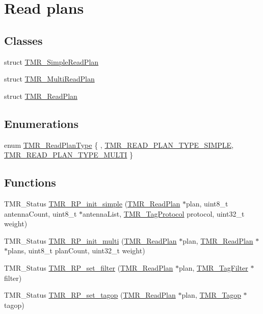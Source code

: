 \hypertarget{group__readplan}{
\section{Read plans}
\label{group__readplan}
}
\subsection*{Classes}
\begin{CompactItemize}
\item 
struct \hyperlink{struct_t_m_r___simple_read_plan}{TMR\_\-SimpleReadPlan}
\item 
struct \hyperlink{struct_t_m_r___multi_read_plan}{TMR\_\-MultiReadPlan}
\item 
struct \hyperlink{struct_t_m_r___read_plan}{TMR\_\-ReadPlan}
\end{CompactItemize}
\subsection*{Enumerations}
\begin{CompactItemize}
\item 
enum \hyperlink{group__readplan_g4646d0bb9359362ac44e57f04f7e429c}{TMR\_\-ReadPlanType} \{ , \hyperlink{group__readplan_gg4646d0bb9359362ac44e57f04f7e429ce19fe5cee99f0bd3a3ae118dced8e426}{TMR\_\-READ\_\-PLAN\_\-TYPE\_\-SIMPLE}, 
\hyperlink{group__readplan_gg4646d0bb9359362ac44e57f04f7e429c886bea5e75d6b2f7d11574666450ab77}{TMR\_\-READ\_\-PLAN\_\-TYPE\_\-MULTI}
 \}
\end{CompactItemize}
\subsection*{Functions}
\begin{CompactItemize}
\item 
TMR\_\-Status \hyperlink{group__readplan_g1af189d2675156c9a068367219fa3d98}{TMR\_\-RP\_\-init\_\-simple} (\hyperlink{struct_t_m_r___read_plan}{TMR\_\-ReadPlan} $\ast$plan, uint8\_\-t antennaCount, uint8\_\-t $\ast$antennaList, \hyperlink{tmr__tag__protocol_8h_1e727f69e94ccc81da4d3b9440aba934}{TMR\_\-TagProtocol} protocol, uint32\_\-t weight)
\item 
TMR\_\-Status \hyperlink{group__readplan_gce3c98ef5a04cfcac4b14e0fff950988}{TMR\_\-RP\_\-init\_\-multi} (\hyperlink{struct_t_m_r___read_plan}{TMR\_\-ReadPlan} $\ast$plan, \hyperlink{struct_t_m_r___read_plan}{TMR\_\-ReadPlan} $\ast$$\ast$plans, uint8\_\-t planCount, uint32\_\-t weight)
\item 
TMR\_\-Status \hyperlink{group__readplan_g34719ef3c329be6b31af3bc2b4b3c234}{TMR\_\-RP\_\-set\_\-filter} (\hyperlink{struct_t_m_r___read_plan}{TMR\_\-ReadPlan} $\ast$plan, \hyperlink{struct_t_m_r___tag_filter}{TMR\_\-TagFilter} $\ast$filter)
\item 
TMR\_\-Status \hyperlink{group__readplan_g5f6032baee5c6a042d2351ecb9ab3953}{TMR\_\-RP\_\-set\_\-tagop} (\hyperlink{struct_t_m_r___read_plan}{TMR\_\-ReadPlan} $\ast$plan, \hyperlink{struct_t_m_r___tagop}{TMR\_\-Tagop} $\ast$tagop)
\end{CompactItemize}


